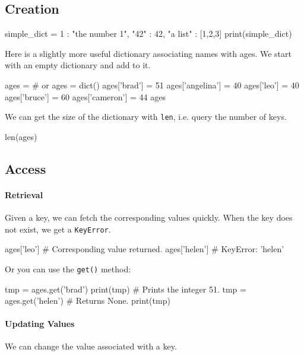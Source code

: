 \documentclass[12pt,letterpaper,twoside]{article}
\begin{document}
\subsection{Creation}

\begin{python}
simple_dict = {1 : "the number 1", "42" : 42, "a list" : [1,2,3]}
print(simple_dict)
\end{python}

Here is a slightly more useful dictionary associating names with ages.
We start with an empty dictionary and add to it.

\begin{python}
ages = {} # or ages = dict()
ages['brad'] = 51
ages['angelina'] = 40
ages['leo'] = 40
ages['bruce'] = 60
ages['cameron'] = 44
ages
\end{python}

We can get the size of the dictionary with \texttt{len}, i.e. query the number of keys.
\begin{python}
len(ages)
\end{python}

\subsection{Access}

\paragraph{Retrieval} Given a key, we can fetch the corresponding values quickly.
When the key does not exist, we get a \texttt{KeyError}.

\begin{python}
ages['leo']     # Corresponding value returned.
ages['helen']   # KeyError: 'helen'
\end{python}

Or you can use the \texttt{get()} method:

\begin{python}
tmp = ages.get('brad')
print(tmp)              # Prints the integer 51.
tmp = ages.get('helen') # Returns None.
print(tmp)              
\end{python}

\vspace{-12pt}
\paragraph{Updating Values}
We can change the value associated with a key.
\end{document}
